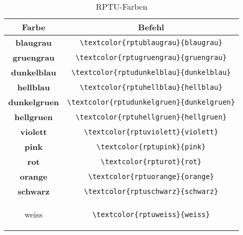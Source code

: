 \begin{table}[ht]
    \label{tab:Farben}
    \caption{RPTU-Farben}
    \centering
    \footnotesize
    \begin{tabular}{@{}cc@{}}
    \toprule
    Farbe & Befehl\\ \midrule
	\bfseries\textcolor{rptublaugrau}{blaugrau}                           & \verb|\textcolor{rptublaugrau}{blaugrau}|       \\
	\bfseries\textcolor{rptugruengrau}{gruengrau}                         & \verb|\textcolor{rptugruengrau}{gruengrau}|     \\
	\bfseries\textcolor{rptudunkelblau}{dunkelblau}                       & \verb|\textcolor{rptudunkelblau}{dunkelblau}|   \\
	\bfseries\textcolor{rptuhellblau}{hellblau}                           & \verb|\textcolor{rptuhellblau}{hellblau}|       \\
	\bfseries\textcolor{rptudunkelgruen}{dunkelgruen}                     & \verb|\textcolor{rptudunkelgruen}{dunkelgruen}| \\
	\bfseries\textcolor{rptuhellgruen}{hellgruen}                         & \verb|\textcolor{rptuhellgruen}{hellgruen}|     \\
	\bfseries\textcolor{rptuviolett}{violett}                             & \verb|\textcolor{rptuviolett}{violett}|         \\
	\bfseries\textcolor{rptupink}{pink}                                   & \verb|\textcolor{rptupink}{pink}|               \\
	\bfseries\textcolor{rpturot}{rot}                                     & \verb|\textcolor{rpturot}{rot}|                 \\
	\bfseries\textcolor{rptuorange}{orange}                               & \verb|\textcolor{rptuorange}{orange}|           \\
	\bfseries\textcolor{rptuschwarz}{schwarz}                             & \verb|\textcolor{rptuschwarz}{schwarz}|         \\
	\bfseries\begin{tcolorbox}\centering\textcolor{rptuweiss}{weiss}\end{tcolorbox} & \verb|\textcolor{rptuweiss}{weiss}|   \\ \bottomrule
    \end{tabular}
\end{table}

\clearpage